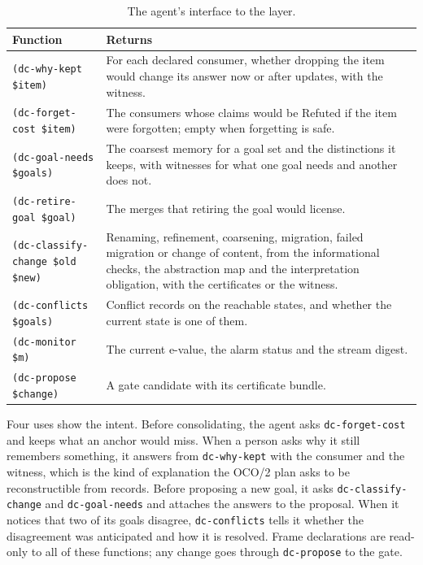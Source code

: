 \documentclass[11pt]{article}
\newcommand{\code}[1]{\texttt{#1}}
\theoremstyle{definition}
\theoremstyle{plain}
\begin{document}
\begin{table}[ht]
\centering\small
\begin{tabularx}{\textwidth}{>{\raggedright\arraybackslash}p{4.3cm}X}
\toprule
Function & Returns\\
\midrule
\code{(dc-why-kept \$item)} & For each declared consumer, whether dropping the item would change
its answer now or after updates, with the witness.\\
\code{(dc-forget-cost \$item)} & The consumers whose claims would be Refuted if the item were
forgotten; empty when forgetting is safe.\\
\code{(dc-goal-needs \$goals)} & The coarsest memory for a goal set and the distinctions it keeps,
with witnesses for what one goal needs and another does not.\\
\code{(dc-retire-goal \$goal)} & The merges that retiring the goal would license.\\
\code{(dc-classify-change \$old \$new)} & Renaming, refinement, coarsening, migration, failed
migration or change of content, from the informational checks, the abstraction map and the
interpretation obligation, with the certificates or the
witness.\\
\code{(dc-conflicts \$goals)} & Conflict records on the reachable states, and whether the current
state is one of them.\\
\code{(dc-monitor \$m)} & The current e-value, the alarm status and the stream digest.\\
\code{(dc-propose \$change)} & A gate candidate with its certificate bundle.\\
\bottomrule
\end{tabularx}
\caption{The agent's interface to the layer.}\label{tab:api}
\end{table}

Four uses show the intent. Before consolidating, the agent asks \code{dc-forget-cost} and keeps
what an anchor would miss. When a person asks why it still remembers something, it answers from
\code{dc-why-kept} with the consumer and the witness, which is the kind of explanation the OCO/2
plan asks to be reconstructible from records. Before proposing a new goal, it asks
\code{dc-classify-change} and \code{dc-goal-needs} and attaches the answers to the proposal. When it
notices that two of its goals disagree, \code{dc-conflicts} tells it whether the disagreement was
anticipated and how it is resolved. Frame declarations are read-only to all of these functions; any
change goes through \code{dc-propose} to the gate.
\end{document}
